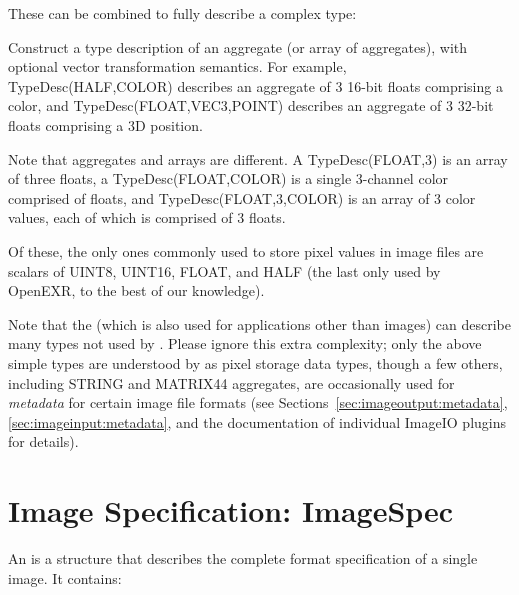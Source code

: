 \noindent These can be combined to fully describe a complex type:

Construct a type description of an aggregate (or array of aggregates),
with optional vector transformation semantics.  For example, 
{\cf TypeDesc(HALF,COLOR)} describes an aggregate of 3 16-bit floats
comprising a color, and {\cf TypeDesc(FLOAT,VEC3,POINT)} describes 
an aggregate of 3 32-bit floats comprising a 3D position.

Note that aggregates and arrays are different.  A {\cf
  TypeDesc(FLOAT,3)} is an array of three floats, a {\cf
  TypeDesc(FLOAT,COLOR)} is a single 3-channel color comprised of
floats, and {\cf TypeDesc(FLOAT,3,COLOR)} is an array of 3 color values,
each of which is comprised of 3 floats.
\apiend

\bigskip

Of these, the only ones commonly used to store pixel values in image files
are scalars of {\cf UINT8}, {\cf UINT16}, {\cf FLOAT}, and {\cf HALF}
(the last only used by OpenEXR, to the best of our knowledge).

Note that the \TypeDesc (which is also used for applications other
than images) can describe many types not used by
\product.  Please ignore this extra complexity; only the above simple types are understood by
\product as pixel storage data types, though a few others, including
{\cf STRING} and {\cf MATRIX44} aggregates, are occasionally used for
\emph{metadata} for certain image file formats (see
Sections~\ref{sec:imageoutput:metadata}, \ref{sec:imageinput:metadata},
and the documentation of individual ImageIO plugins for details).

\section{Image Specification: {\cf ImageSpec}}

An \ImageSpec is a structure that describes the complete
format specification of a single image.  It contains:

